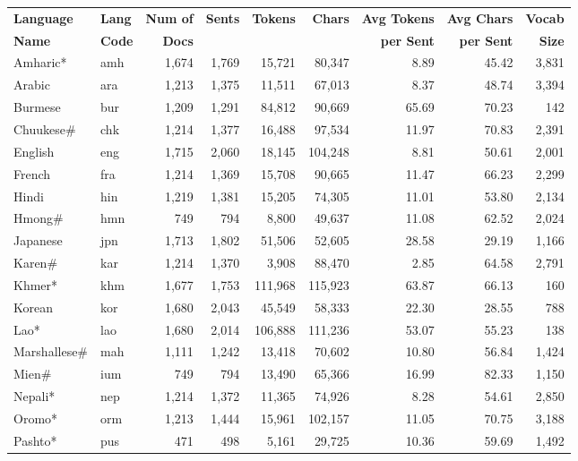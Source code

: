 \begin{table}[t]
\centering
\small
\setlength{\tabcolsep}{4pt}
\begin{tabular}{l l r r r r r r r}
\toprule
\textbf{Language} & \textbf{Lang} & \textbf{Num of} & \textbf{Sents} & \textbf{Tokens} & \textbf{Chars} & \textbf{Avg Tokens} & \textbf{Avg Chars} & \textbf{Vocab} \\
\textbf{Name} & \textbf{Code} & \textbf{Docs} &  &  &  & \textbf{per Sent} & \textbf{per Sent} & \textbf{Size} \\
\midrule
Amharic* & amh & 1,674 & 1,769 & 15,721 & 80,347 & 8.89 & 45.42 & 3,831 \\
Arabic & ara & 1,213 & 1,375 & 11,511 & 67,013 & 8.37 & 48.74 & 3,394 \\
Burmese & bur & 1,209 & 1,291 & 84,812 & 90,669 & 65.69 & 70.23 & 142 \\
Chuukese\# & chk & 1,214 & 1,377 & 16,488 & 97,534 & 11.97 & 70.83 & 2,391 \\
English & eng & 1,715 & 2,060 & 18,145 & 104,248 & 8.81 & 50.61 & 2,001 \\
French & fra & 1,214 & 1,369 & 15,708 & 90,665 & 11.47 & 66.23 & 2,299 \\
Hindi & hin & 1,219 & 1,381 & 15,205 & 74,305 & 11.01 & 53.80 & 2,134 \\
Hmong\# & hmn & 749 & 794 & 8,800 & 49,637 & 11.08 & 62.52 & 2,024 \\
Japanese & jpn & 1,713 & 1,802 & 51,506 & 52,605 & 28.58 & 29.19 & 1,166 \\
Karen\# & kar & 1,214 & 1,370 & 3,908 & 88,470 & 2.85 & 64.58 & 2,791 \\
Khmer* & khm & 1,677 & 1,753 & 111,968 & 115,923 & 63.87 & 66.13 & 160 \\
Korean & kor & 1,680 & 2,043 & 45,549 & 58,333 & 22.30 & 28.55 & 788 \\
Lao* & lao & 1,680 & 2,014 & 106,888 & 111,236 & 53.07 & 55.23 & 138 \\
Marshallese\# & mah & 1,111 & 1,242 & 13,418 & 70,602 & 10.80 & 56.84 & 1,424 \\
Mien\# & ium & 749 & 794 & 13,490 & 65,366 & 16.99 & 82.33 & 1,150 \\
Nepali* & nep & 1,214 & 1,372 & 11,365 & 74,926 & 8.28 & 54.61 & 2,850 \\
Oromo* & orm & 1,213 & 1,444 & 15,961 & 102,157 & 11.05 & 70.75 & 3,188 \\
Pashto* & pus & 471 & 498 & 5,161 & 29,725 & 10.36 & 59.69 & 1,492 \\

\end{tabular}
\end{table}
